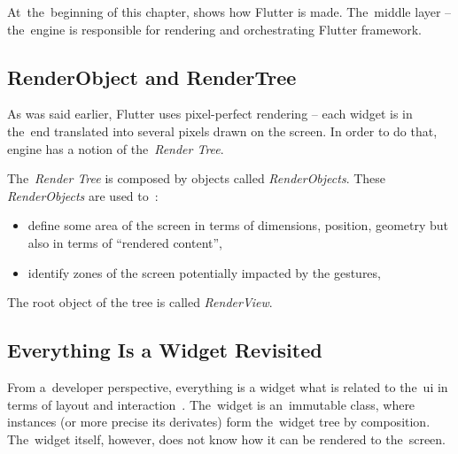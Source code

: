 At~the~beginning of this chapter,  shows how Flutter is made. The~middle layer -- the~engine is responsible for rendering and orchestrating Flutter framework. 
\subsection{RenderObject and RenderTree}
As was said earlier, Flutter uses pixel-perfect rendering -- each widget is in the~end translated into several pixels drawn on the screen. In order to do that, engine has a notion of the~\textit{Render Tree}.

The~\textit{Render Tree} is composed by objects called \textit{RenderObjects}. These \textit{RenderObjects} are used to~\cite{didier-internals}:
\begin{itemize}
    \item define some area of the screen in terms of dimensions, position, geometry but also in terms of ``rendered content'',
    \item identify zones of the screen potentially impacted by the gestures,
\end{itemize}
The root object of the tree is called \textit{RenderView}.
\subsection{Everything Is a Widget Revisited}
From a~developer perspective, everything is a widget what is related to the~\gls{ui} in terms of layout and interaction~\cite{didier-internals}. The~widget is an~immutable class, where instances (or more precise its derivates) form the~widget tree by composition. The~widget itself, however, does not know how it can be rendered to the~screen. 

